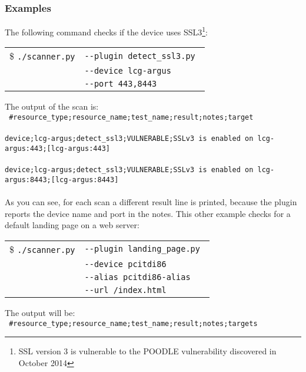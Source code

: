 \subsubsection{Examples}
The following command checks if the device uses SSL3\footnote{SSL version 3 is vulnerable to the POODLE vulnerability discovered in October 2014}:
\begin{table}[H]

    \begin{tabular}{ c  l }


\$ \texttt{./scanner.py} & \texttt{-{}-plugin detect\_ssl3.py } \\
  & \texttt{-{}-device lcg-argus} \\
  & \texttt{-{}-port 443,8443}    	       
	\end{tabular}    

\end{table}
\noindent
The output of the scan is: 
\\
\texttt{
\#resource\_type;resource\_name;test\_name;result;notes;target}
\\
\\
\texttt{device;lcg-argus;detect\_ssl3;VULNERABLE;SSLv3 is enabled on lcg-argus:443;[lcg-argus:443]}
\\
\\
\texttt{device;lcg-argus;detect\_ssl3;VULNERABLE;SSLv3 is enabled on lcg-argus:8443;[lcg-argus:8443]}
\\
\\
As you can see, for each scan a different result line is printed, because the plugin reports the device name and port in the notes. 
This other example checks for a default landing page on a web server:
\begin{table}[H]

    \begin{tabular}{ c  l }


\$ \texttt{./scanner.py} & \texttt{-{}-plugin landing\_page.py } \\
  & \texttt{-{}-device pcitdi86} \\
  & \texttt{-{}-alias pcitdi86-alias}\\    	       
    & \texttt{-{}-url /index.html}\\ 
	\end{tabular}    

\end{table}
\noindent
The output will be:
\\
\texttt{
\#resource\_type;resource\_name;test\_name;result;notes;targets}
\\
